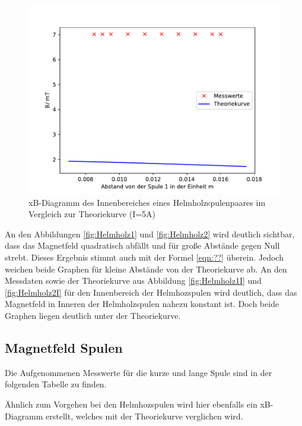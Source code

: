 \begin{figure}[H]
  \centering
  \includegraphics{Helmholz2I.pdf}
  \caption{xB-Diagramm des Innenbereiches eines
  Helmholzspulenpaares im Vergleich zur Theoriekurve
  (I=5A)}
  \label{fif:Helmholz2I}
\end{figure}
\noindent An den Abbildungen \ref{fig:Helmholz1}
und \ref{fig:Helmholz2} wird deutlich sichtbar, dass
das Magnetfeld quadratisch abfällt und für große Abstände
gegen Null strebt. Dieses Ergebnis stimmt auch mit
der Formel \ref{eqn:??} überein. Jedoch weichen beide
Graphen für kleine Abstände von der Theoriekurve ab.
\noindent An den Messdaten sowie der Theoriekurve aus
Abbildung \ref{fig:Helmholz1I} und \ref{fig:Helmholz2I}
für den Innenbereich der Helmhozspulen wird deutlich, dass
das Magnetfeld in Inneren der Helmholzspulen
nahezu konstant ist. Doch beide Graphen liegen
deutlich unter der Theoriekurve.


\subsection{Magnetfeld Spulen}
Die Aufgenommenen Messwerte für die kurze und lange
Spule sind in der folgenden Tabelle zu finden.

Ähnlich zum Vorgehen bei den Helmhozspulen wird hier
ebenfalls ein xB-Diagramm erstellt, welches mit
der Theoriekurve verglichen wird.

